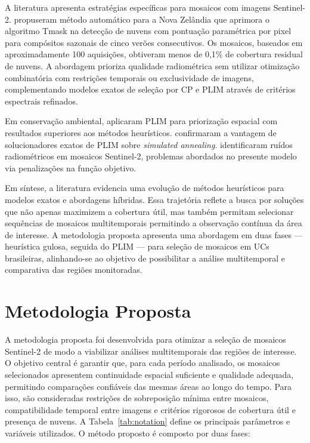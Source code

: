 \documentclass[a4paper,11pt]{article}
\begin{document}
A literatura apresenta estratégias específicas para mosaicos com imagens Sentinel-2. \citet{shepherd2020automated} propuseram método automático para a Nova Zelândia que aprimora o algoritmo Tmask na detecção de nuvens com pontuação paramétrica por pixel para compósitos sazonais de cinco verões consecutivos. Os mosaicos, baseados em aproximadamente 100 aquisições, obtiveram menos de 0,1\% de cobertura residual de nuvens. A abordagem prioriza qualidade radiométrica sem utilizar otimização combinatória com restrições temporais ou exclusividade de imagens, complementando modelos exatos de seleção por CP e PLIM \citep{combarro-simon-constraint-2023} através de critérios espectrais refinados.

Em conservação ambiental, \citet{beyer:2016} aplicaram PLIM para priorização espacial com resultados superiores aos métodos heurísticos. \citet{schuster:2020} confirmaram a vantagem de solucionadores exatos de PLIM sobre \textit{simulated annealing}. \citet{rodriguez-puerta:2024} identificaram ruídos radiométricos em mosaicos Sentinel-2, problemas abordados no presente modelo via penalizações na função objetivo.

Em síntese, a literatura evidencia uma evolução de métodos heurísticos para modelos exatos e abordagens híbridas. Essa trajetória reflete a busca por soluções que não apenas maximizem a cobertura útil, mas também permitam selecionar sequências de mosaicos multitemporais permitindo a observação contínua da área de interesse. A metodologia proposta apresenta uma abordagem em duas fases --- heurística gulosa, seguida do PLIM --- para seleção de mosaicos em UCs brasileiras, alinhando-se ao objetivo de possibilitar a análise multitemporal e comparativa das regiões monitoradas.

\vspace{-7mm}

\section{Metodologia Proposta}
\vspace{-5mm}
A metodologia proposta foi desenvolvida para otimizar a seleção de mosaicos Sentinel-2 de modo a viabilizar análises multitemporais das regiões de interesse. O objetivo central é garantir que, para cada período analisado, os mosaicos selecionados apresentem continuidade espacial suficiente e qualidade adequada, permitindo comparações confiáveis das mesmas áreas ao longo do tempo. Para isso, são consideradas restrições de sobreposição mínima entre mosaicos, compatibilidade temporal entre imagens e critérios rigorosos de cobertura útil e presença de nuvens. A Tabela~\ref{tab:notation} define os principais parâmetros e variáveis utilizados. O método proposto é composto por duas fases:
\end{document}
